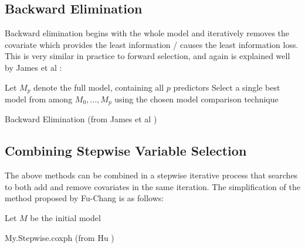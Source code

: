 \subsection{Backward Elimination}

Backward elimination begins with the whole model and iteratively removes the covariate which provides the least information / causes the least information loss. This is very similar in practice to forward selection, and again is explained well by James et al :

\begin{algorithm}[H]
    Let $M_p$ denote the full model, containing all $p$ predictors\;
    Select a single best model from among $M_0,\ldots,M_p$ using the chosen model comparison technique\;
    \caption{Backward Elimination (from James et al )}\label{alg:backward-elimination}
\end{algorithm}

\subsection{Combining Stepwise Variable Selection}\label{sec:combining-stepwise-variable-selection}

The above methods can be combined in a stepwise iterative process that searches to both add and remove covariates in the same iteration. The simplification of the method proposed by Fu-Chang  is as follows:

\begin{algorithm}[H]
    Let $M$ be the initial model\;
    \caption{My.Stepwise.coxph (from Hu )}\label{alg:my.stepwise.coxph}
\end{algorithm}

